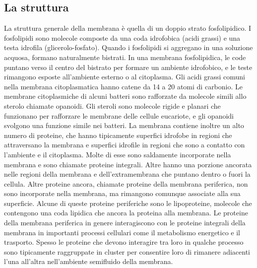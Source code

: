 \subsection{La struttura}
La struttura generale della membrana è quella di un doppio strato fosfolipidico. I fosfolipidi sono molecole composte da una coda idrofobica (acidi grassi) e una testa idrofila 
(glicerolo-fosfato).
Quando i fosfolipidi si aggregano in una soluzione acquosa, formano naturalmente bistrati. In una membrana 
fosfolipidica, le code puntano verso il centro del bistrato per formare un ambiente idrofobico, e le teste rimangono esposte 
all'ambiente esterno o al citoplasma. Gli acidi grassi comuni nella membrana citoplasmatica hanno catene da  14 a 20 atomi di carbonio.
Le membrane citoplasmiche di alcuni batteri sono rafforzate da molecole simili allo sterolo chiamate opanoidi. Gli steroli sono molecole rigide e planari 
che funzionano per rafforzare le membrane delle cellule eucariote, e gli opanoidi svolgono una funzione simile nei batteri.
La membrana contiene inoltre un alto numero di proteine, che hanno tipicamente superfici idrofobe in regioni che attraversano la membrana e superfici 
idrofile in regioni che sono a contatto con l'ambiente e il citoplasma. Molte di esse sono saldamente incorporate nella membrana e sono chiamate proteine 
integrali. Altre hanno una porzione ancorata nelle regioni della membrana e dell'extramembrana che puntano dentro o fuori la cellula. Altre proteine ancora, 
chiamate proteine della membrana periferica, non sono incorporate nella membrana, ma rimangono comunque associate alla sua superficie. Alcune di queste 
proteine periferiche sono le lipoproteine, molecole che contengono una coda lipidica che ancora la proteina alla membrana. Le proteine della membrana 
periferica in genere interagiscono con le proteine integrali della membrana in importanti processi cellulari come il metabolismo energetico e il trasporto. 
Spesso le proteine che devono interagire tra loro in qualche processo sono tipicamente raggruppate in cluster per consentire loro di rimanere adiacenti 
l'una all'altra nell'ambiente semifluido della  membrana.
